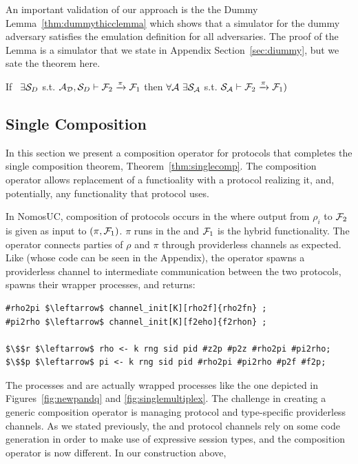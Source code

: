 An important validation of our approach is the the Dummy Lemma~\ref{thm:dummythicclemma} which shows that a simulator for the dummy adversary satisfies the emulation definition for all adversaries. The proof of the Lemma is a simulator that we state in Appendix Section~\ref{sec:diummy}, but we sate the theorem here. 
\begin{theorem}\label{thm:dummythicclemma}
If \ $\exists \mathcal{S}_{D}$ s.t. $ \mathcal{A}_\mathcal{D}, \mathcal{S}_{D} \vdash \mathcal{F}_2 \xrightarrow{\pi} \mathcal{F}_1$ then $\forall \mathcal{A} \ \exists \mathcal{S}_\mathcal{A}$ s.t. $\mathcal{S}_{\mathcal{A}} \vdash  \mathcal{F}_2 \xrightarrow{\pi} \mathcal{F}_1)$ 
\end{theorem}

\subsection{Single Composition}
In this section we present a composition operator for protocols that completes the single composition theorem, Theorem~\ref{thm:singlecomp}.
The composition operator allows replacement of a functioality with a protocol realizing it, and, potentially, any functionality that protocol uses.

In NomosUC, composition of protocols occurs in the \partywrapper where output from $\rho_i$ to $\mathcal{F}_2$ is given as input to $(\pi, \mathcal{F}_1)$. $\pi$ runs in the \partywrapper and $\mathcal{F}_1$ is the hybrid functionality. 
The operator connects parties of $\rho$ and $\pi$ through providerless channels as expected. 
Like  (whose code can be seen in the Appendix), the operator spawns a providerless channel to intermediate communication between the two protocols, spawns their wrapper processes, and returns:

\begin{lstlisting}[basicstyle=\footnotesize\BeraMonottFamily, mathescape, frame=single]
#rho2pi $\leftarrow$ channel_init[K][rho2f]{rho2fn} ;
#pi2rho $\leftarrow$ channel_init[K][f2eho]{f2rhon} ;

$\$$r $\leftarrow$ rho <- k rng sid pid #z2p #p2z #rho2pi #pi2rho; 
$\$$p $\leftarrow$ pi <- k rng sid pid #rho2pi #pi2rho #p2f #f2p;
\end{lstlisting}
The processes  and  are actually wrapped processes like the one depicted in Figures~\ref{fig:newpandq} and \ref{fig:singlemultiplex}.
The challenge in creating a generic composition operator is managing protocol and type-specific providerless channels.  
As we stated previously, the \partywrapper and protocol channels rely on some code generation in order to make use of expressive session types, and the composition operator is now different.
In our construction above, 

